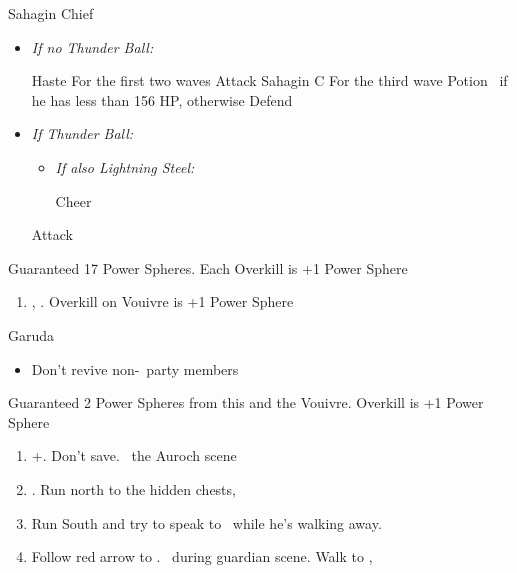 \begin{battle}{Sahagin Chief}
    \begin{itemize}
        \item \textit{If no Thunder Ball:}
        \begin{itemize}
            \tidusf Haste \tidus
            \wakkaf For the first two waves Attack Sahagin C
            \wakkaf For the third wave Potion \tidus\ if he has less than 156 HP, otherwise Defend
        \end{itemize}
        \item \textit{If Thunder Ball:}
        \begin{itemize}
            \tidusf Cheer
            \wakkaf Attack
            \tidusf Haste \tidus
            \tidusf Haste \wakka
            \item \textit{If also Lightning Steel:}
            \begin{itemize}
                \tidusf Cheer
            \end{itemize}
        \end{itemize}
        \tidusf Attack
    \end{itemize}
    Guaranteed 17 Power Spheres. Each Overkill is +1 Power Sphere
\end{battle}
\begin{enumerate}[resume]
    \item \sd, \skippablefmv. Overkill on Vouivre is +1 Power Sphere
\end{enumerate}
\begin{battle}[1800]{Garuda}
    \begin{itemize}
        \tidusf Haste \auron
        \auronf Attack x3
        \wakkaf Defend, Potion if \tidus\ has less than 312 HP
        \tidusf Attack
        \tidusf Defend
        \wakkaf Defend, Potion if \auron\ has less than 202 HP
        \auronf Attack x3
        \item Don't revive non-\auron\ party members
    \end{itemize}
    Guaranteed 2 Power Spheres from this and the Vouivre. Overkill is +1 Power Sphere
\end{battle}
\begin{enumerate}[resume]
    \item \cs+\skippablefmv[1:30]. Don't save. \sd\ the Auroch scene
    \item \cs[4:50]. Run north to the hidden chests, 
    \item Run South and try to speak to \auron\ while he's walking away.
    \item Follow red arrow to \yuna. \sd\ during guardian scene. Walk to \yuna, \cs[4:20]
\end{enumerate}